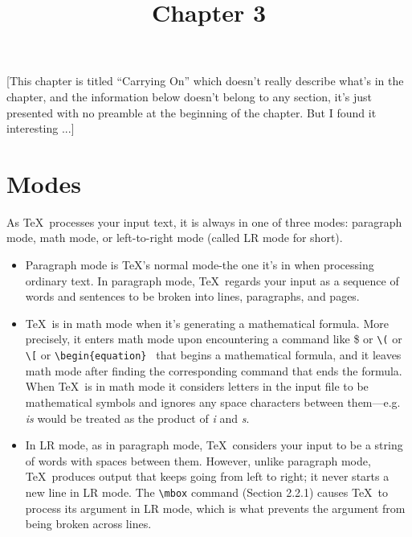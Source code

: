 \documentclass{article}
\title{Chapter 3} %
\author{}
\date{}
\begin{document}

\maketitle %

[This chapter is titled ``Carrying On'' which doesn't really describe what's in the chapter, and the
information below doesn't belong to any section, it's just presented with no preamble at the
beginning of the chapter. But I found it interesting ...] 

\section{Modes}

As \TeX\ processes your input text, it is always in one of three modes: paragraph mode, math mode,
or left-to-right mode (called LR mode for short). 

\begin{itemize}
   
   \item Paragraph mode is \TeX's normal mode-the one it's in when processing ordinary text. In
    paragraph mode, \TeX\ regards your input as a sequence of words and sentences to be broken into
    lines, paragraphs, and pages.

    \item \TeX\ is in math mode when it's generating a mathematical formula. More precisely, it
     enters math mode upon encountering a command like 
     \$ or 
     {\tt \textbackslash (} or
     {\tt \textbackslash [} or 
     {\tt \textbackslash begin\{equation\} } 
     that begins a mathematical formula, and it leaves math mode after finding the corresponding
     command that ends the formula. When \TeX\ is in math mode it considers letters in the input
     file to be mathematical symbols and ignores any space characters 
     between them—e.g. \emph{is} would be treated as the product of \emph{i} and \emph{s}.
     
    \item In LR mode, as in paragraph mode, \TeX\ considers your input to be a string of words with
     spaces between them. However, unlike paragraph mode, \TeX\ produces output that keeps going
     from left to right; it never starts a new line in LR mode. The {\tt \textbackslash mbox} command
     (Section 2.2.1) causes \TeX\ to process its argument in LR mode, which is what prevents the
     argument from being broken across lines.

\end{itemize}
\end{document}
